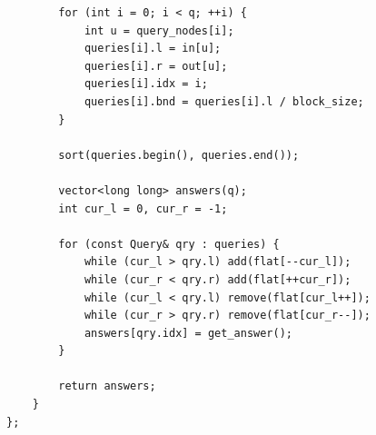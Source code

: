 \documentclass[9pt,a4paper,twocolumn]{extarticle}
\begin{document}
\begin{lstlisting}
        for (int i = 0; i < q; ++i) {
            int u = query_nodes[i];
            queries[i].l = in[u];
            queries[i].r = out[u];
            queries[i].idx = i;
            queries[i].bnd = queries[i].l / block_size;
        }

        sort(queries.begin(), queries.end());

        vector<long long> answers(q);
        int cur_l = 0, cur_r = -1;

        for (const Query& qry : queries) {
            while (cur_l > qry.l) add(flat[--cur_l]);
            while (cur_r < qry.r) add(flat[++cur_r]);
            while (cur_l < qry.l) remove(flat[cur_l++]);
            while (cur_r > qry.r) remove(flat[cur_r--]);
            answers[qry.idx] = get_answer();
        }

        return answers;
    }
};
\end{lstlisting}

\filbreak
\end{document}
